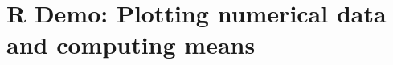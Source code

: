 \documentclass[slidestop,compress,mathserif]{beamer}
\makeatletter
\def\chpii@path{../../../Chp 2}
\makeatother
\begin{document}
\section{R Demo: Plotting numerical data and computing means}












\end{document}
